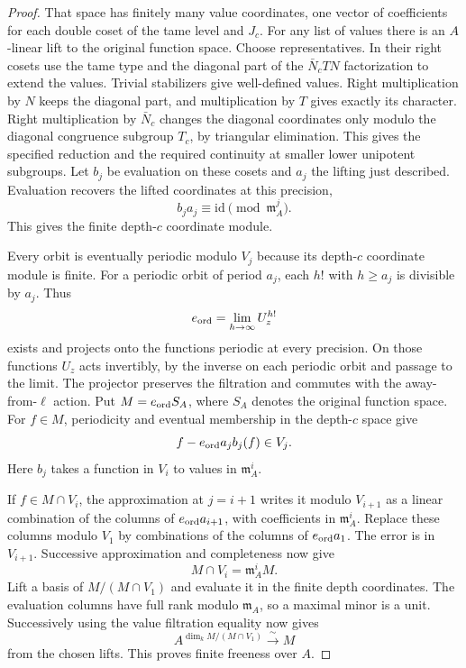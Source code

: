 \begin{proof}
That space has finitely many value coordinates, one
vector of coefficients for each double coset of the
tame level and \(J_c\). For any list of values there
is an \(A\)-linear lift to the original function space.
Choose representatives. In their right cosets use
the tame type and the diagonal part of the
\(\bar N_c T N\) factorization to extend the values.
Trivial stabilizers give well-defined values.
Right multiplication by \(N\) keeps the diagonal
part, and multiplication by \(T\) gives exactly
its character. Right multiplication by \(\bar N_c\)
changes the diagonal coordinates only modulo the
diagonal congruence subgroup \(T_c\), by triangular
elimination. This gives the specified reduction and
the required continuity at smaller lower unipotent
subgroups. Let \(b_j\) be evaluation on these cosets and \(a_j\)
the lifting just described. Evaluation recovers the lifted coordinates at this precision,
\[
 b_ja_j\equiv\mathrm{id}\pmod{\mathfrak m_A^j}.
\]
This gives the finite depth-\(c\) coordinate module.

Every orbit is eventually periodic modulo \(V_j\) because its
depth-\(c\) coordinate module is finite. For a periodic orbit
of period \(a_j\), each \(h!\) with \(h\ge a_j\) is divisible by
\(a_j\). Thus
\[
                    e_{\rm ord}=\lim_{h\to\infty}U_z^{h!}
\]
exists and projects onto the functions periodic at every precision. On those functions
\(U_z\) acts invertibly, by the inverse on each
periodic orbit and passage to the limit. The
projector preserves the filtration and commutes with
the away-from-\(\ell\) action. Put \(M=e_{\rm ord}S_A\),
where \(S_A\) denotes the original function space.
For \(f\in M\), periodicity and eventual membership
in the depth-\(c\) space give
\[
   f-e_{\rm ord}a_j b_j(f)\in V_j .
\]
Here \(b_j\) takes a function in \(V_i\) to values
in \(\mathfrak m_A^i\).

If \(f\in M\cap V_i\), the
approximation at \(j=i+1\) writes it modulo \(V_{i+1}\)
as a linear combination of the columns of
\(e_{\rm ord}a_{i+1}\), with coefficients in
\(\mathfrak m_A^i\). Replace these columns modulo
\(V_1\) by combinations of the columns of
\(e_{\rm ord}a_1\). The error is in \(V_{i+1}\).
Successive approximation and completeness now give
\[
   M\cap V_i=\mathfrak m_A^i M.
\]
Lift a basis of \(M/(M\cap V_1)\) and evaluate it in the
finite depth coordinates. The evaluation columns have full rank
modulo \(\mathfrak m_A\), so a maximal minor is a unit.
Successively using the value filtration equality now gives
\[
       A^{\dim_k M/(M\cap V_1)}\xrightarrow{\;\sim\;} M
\]
from the chosen lifts. This
proves finite freeness over \(A\).


\end{proof}
